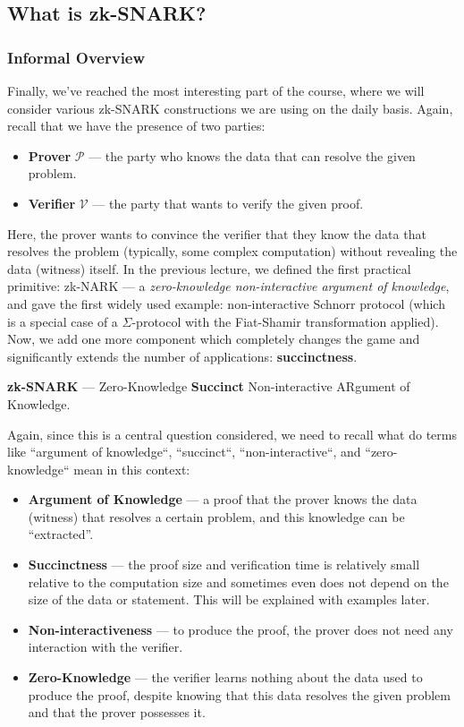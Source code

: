\documentclass[../lecture-notes.tex]{subfiles}
\begin{document}
\subsection{What is zk-SNARK?}

\subsubsection{Informal Overview}

Finally, we've reached the most interesting part of the course, where we will consider various zk-SNARK constructions we are using on the daily basis. Again, recall that we have the presence of two parties:
\begin{itemize}
    \item \textbf{Prover} $\mathcal{P}$ --- the party who knows the data that can resolve the given problem.
    \item \textbf{Verifier} $\mathcal{V}$ --- the party that wants to verify the given proof.
\end{itemize}

Here, the prover wants to convince the verifier that they know the data that resolves the problem (typically, some complex computation) without revealing the data (witness) itself. In the previous lecture, we defined the first practical primitive: zk-NARK --- a \textit{zero-knowledge non-interactive argument of knowledge}, and gave the first widely used example: non-interactive Schnorr protocol (which is a special case of a $\Sigma$-protocol with the Fiat-Shamir transformation applied). Now, we add one more component which completely changes the game and significantly extends the number of applications: \textbf{succinctness}.

\begin{definition}
    \textbf{zk-SNARK} --- Zero-Knowledge \textbf{Succinct} Non-interactive ARgument of Knowledge.
\end{definition}

Again, since this is a central question considered, we need to recall what do terms like ``argument of knowledge``, ``succinct``, ``non-interactive``, and 
``zero-knowledge`` mean in this context:

\begin{itemize}
    \item \textbf{Argument of Knowledge} --- a proof that the prover knows the data (witness) that resolves a certain
    problem, and this knowledge can be ``extracted''.
    \item \textbf{Succinctness} --- the proof size and verification time is relatively small relative to the computation size and sometimes even does not depend on the size of 
    the data or statement. This will be explained with examples later.
    \item \textbf{Non-interactiveness} --- to produce the proof, the prover does not need any interaction
    with the verifier.
    \item \textbf{Zero-Knowledge} --- the verifier learns nothing about the data used to produce the
    proof, despite knowing that this data resolves the given problem and that the prover possesses it.
\end{itemize}
\end{document}
